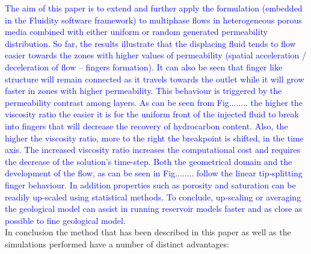 \documentclass[preprint,authoryear,12pt]{elsarticle}
\begin{document}
\textcolor{blue}{The aim of this paper is to extend and further apply the formulation (embedded in the Fluidity software framework) to multiphase flows in heterogeneous porous media combined with either uniform or random generated permeability distribution. So far, the results illustrate that the displacing fluid tends to flow easier towards the zones with higher values of permeability (spatial acceleration / deceleration of flow – fingers formation). It can also be seen that finger like structure will remain connected as it travels towards the outlet while it will grow faster in zones with higher permeability. This behaviour is triggered by the permeability contrast among layers.
As can be seen from Fig........ the higher the viscosity ratio the easier it is for the uniform front of the injected fluid to break into fingers that will decrease the recovery of hydrocarbon content. Also, the higher the viscosity ratio, more to the right the breakpoint is shifted, in the time axis. The increased viscosity ratio increases the computational cost and requires the decrease of the solution's time-step.
Both the geometrical domain and the development of the flow, as can be seen in Fig........ follow the linear tip-splitting finger behaviour. In addition properties such as porosity and saturation can be readily up-scaled using statistical methods.%
To conclude, up-scaling or averaging the geological model can assist in running reservoir models faster and as close as possible to fine geological model.}\\

In conclusion the method that has been described in this paper as well as the simulations performed have a number of distinct advantages: 
\end{document}
